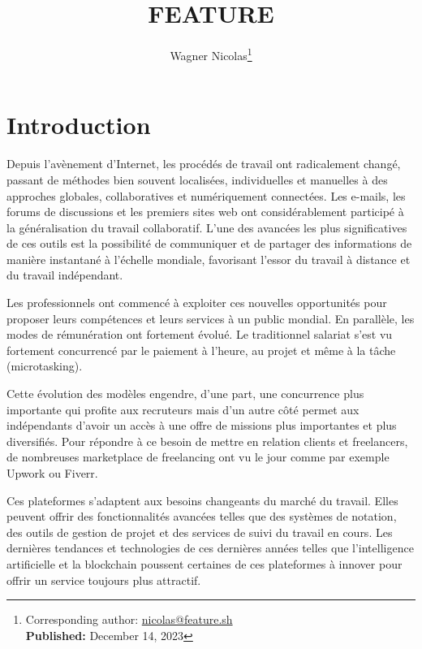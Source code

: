 \documentclass[
	a4paper, %
	10pt, %
	unnumberedsections, %
	twoside, %
]{LTJournalArticle}
\title{FEATURE} %
\author{%
	Wagner Nicolas\thanks{Corresponding author: \href{mailto:nicolas@feature.sh}{nicolas@feature.sh}\\ \textbf{Published:} December 14, 2023}
}
\begin{document}
\maketitle %


\section{Introduction}

Depuis l'avènement d'Internet, les procédés de travail ont radicalement changé, passant de méthodes bien souvent localisées, individuelles et manuelles à des approches globales, collaboratives et numériquement connectées. Les e-mails, les forums de discussions et les premiers sites web ont considérablement participé à la généralisation du travail collaboratif. L'une des avancées les plus significatives de ces outils est la possibilité de communiquer et de partager des informations de manière instantané à l'échelle mondiale, favorisant l'essor du travail à distance et du travail indépendant.

Les professionnels ont commencé à exploiter ces nouvelles opportunités pour proposer leurs compétences et leurs services à un public mondial. En parallèle, les modes de rémunération ont fortement évolué. Le traditionnel salariat s’est vu fortement concurrencé par le paiement à l'heure, au projet et même à la tâche (microtasking).

Cette évolution des modèles engendre, d’une part, une concurrence plus importante qui profite aux recruteurs mais d’un autre côté permet aux indépendants d’avoir un accès à une offre de missions plus importantes et plus diversifiés. Pour répondre à ce besoin de mettre en relation clients et freelancers, de nombreuses marketplace de freelancing ont vu le jour comme par exemple Upwork ou Fiverr.

Ces plateformes s'adaptent aux besoins changeants du marché du travail. Elles peuvent offrir des fonctionnalités avancées telles que des systèmes de notation, des outils de gestion de projet et des services de suivi du travail en cours. Les dernières tendances et technologies de ces dernières années telles que l’intelligence artificielle et la blockchain poussent certaines de ces plateformes à innover pour offrir un service toujours plus attractif.
\end{document}
